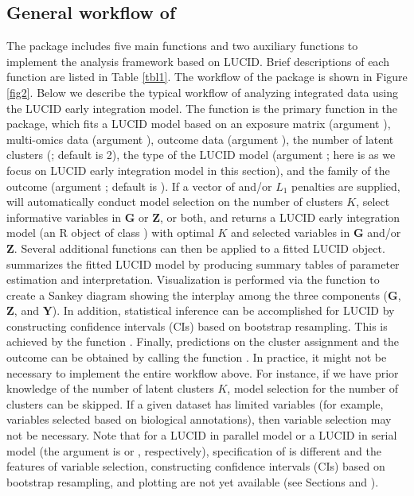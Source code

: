 \subsection{General workflow of } \label{sec2.2}
The  package includes five main functions and two auxiliary functions to implement the analysis framework based on LUCID. Brief descriptions of each function are listed in Table \ref{tbl1}. The workflow of the  package is shown in Figure \ref{fig2}. Below we describe the typical workflow of analyzing integrated data using the LUCID early integration model.
The function  is the primary function in the package, which fits a LUCID model based on an exposure matrix (argument ), multi-omics data (argument ), outcome data (argument ), the number of latent clusters (; default is 2), the type of the LUCID model (argument ; here is  as we focus on LUCID early integration model in this section), and the family of the outcome (argument ; default is ). If a vector of  and/or $L_1$ penalties are supplied,  will automatically conduct model selection on the number of clusters $K$, select informative variables in $\bm G$ or $\bm Z$,  or both, and returns a LUCID early integration model (an R object of class ) with optimal $K$ and selected variables in $\bm G$ and/or $\bm Z$. Several additional functions can then be applied to a fitted LUCID object.  summarizes the fitted LUCID model by producing summary tables of parameter estimation and interpretation. Visualization is performed via the  function to create a Sankey diagram showing the interplay among the three components ($\bm G$, $\bm Z$, and $\bm Y$). In addition, statistical inference can be accomplished for LUCID by constructing confidence intervals (CIs) based on bootstrap resampling. This is achieved by the function . Finally, predictions on the cluster assignment and the outcome can be obtained by calling the function . In practice, it might not be necessary to implement the entire workflow above. For instance, if we have prior knowledge of the number of latent clusters $K$, model selection for the number of clusters can be skipped. If a given dataset has limited variables (for example, variables selected based on biological annotations), then variable selection may not be necessary. Note that for a LUCID in parallel model or a LUCID in serial model (the argument  is  or , respectively), specification of  is different and the features of variable selection, constructing confidence intervals (CIs) based on bootstrap resampling, and plotting are not yet available (see Sections  and ).


